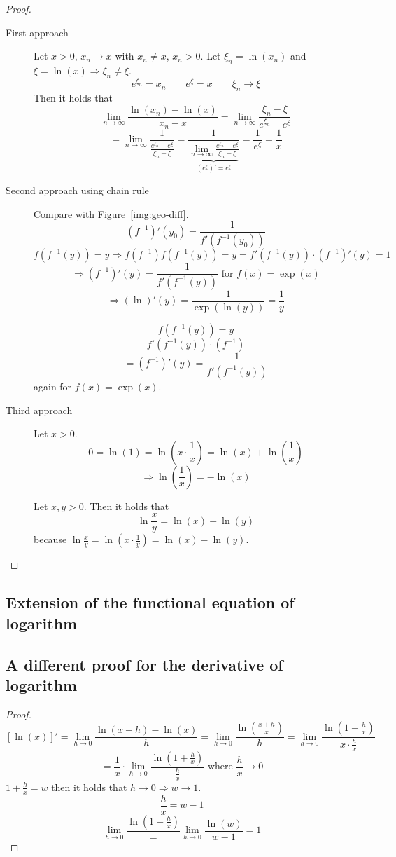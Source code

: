 \documentclass[a4paper,landscape,twocolumn]{article}
\theoremstyle{definition}
\begin{document}
\begin{proof}
  \begin{description}
    \item[First approach]
      Let $x > 0$, $x_n \to x$ with $x_n \neq x$, $x_n > 0$.
      Let $\xi_n = \ln(x_n)$ and $\xi = \ln(x) \Rightarrow \xi_n \neq \xi$.
      \[ e^{\xi_n} = x_n \qquad e^\xi = x \qquad \xi_n \to \xi \]
      Then it holds that
      \[ \lim_{n\to\infty} \frac{\ln(x_n) - \ln(x)}{x_n - x} = \lim_{n\to\infty} \frac{\xi_n - \xi}{e^{\xi_n} - e^\xi} \]
      \[
        = \lim_{n\to\infty} \frac{1}{\frac{e^{\xi_n} - e^\xi}{\xi_n - \xi}}
        = \frac{1}{\underbrace{\lim_{n\to\infty} \frac{e^{\xi_n} - e^\xi}{\xi_n - \xi}}_{(e^\xi)' = e^\xi}}
        = \frac1{e^\xi} = \frac1x
      \]
    \item[Second approach using chain rule]
      Compare with Figure~\ref{img:geo-diff}.
      \[ (f^{-1})'(y_0) = \frac{1}{f'(f^{-1}(y_0))} \]
      \[ f(f^{-1}(y)) = y \Rightarrow f(f^{-1}) f(f^{-1}(y)) = y = f'(f^{-1}(y)) \cdot (f^{-1})'(y) = 1 \]
      \[ \Rightarrow (f^{-1})'(y) = \frac{1}{f'(f^{-1}(y))} \text{ for } f(x) = \exp(x) \]
      \[ \Rightarrow (\ln)'(y) = \frac{1}{\exp(\ln(y))} = \frac{1}{y} \]

      \[ f(f^{-1}(y)) = y \]
      \[ f'(f^{-1}(y)) \cdot (f^{-1}) \]
      \[ = (f^{-1})'(y) = \frac{1}{f'(f^{-1}(y))} \]
      again for $f(x) = \exp(x)$.
    \item[Third approach]
      Let $x > 0$.
      \[ 0 = \ln(1) = \ln\left(x \cdot \frac1x\right) = \ln(x) + \ln\left(\frac1x\right) \]
      \[ \Rightarrow \ln\left(\frac1x\right) = -\ln(x) \]

      Let $x,y > 0$. Then it holds that
      \[ \ln{\frac{x}{y}} = \ln(x) - \ln(y) \]
      because $\ln\frac{x}{y} = \ln(x \cdot \frac1y) = \ln(x) - \ln(y)$.
  \end{description}
\end{proof}

\subsection{Extension of the functional equation of logarithm}
%


\subsection{A different proof for the derivative of logarithm}
%
\begin{proof}
  \[
    [\ln(x)]'
    = \lim_{h\to0} \frac{\ln(x + h) - \ln(x)}{h}
    = \lim_{h\to0} \frac{\ln\left(\frac{x+h}{x}\right)}{h}
    = \lim_{h\to0} \frac{\ln\left(1 + \frac{h}{x}\right)}{x \cdot \frac hx}
  \] \[
    = \frac1x \cdot \lim_{h\to0} \frac{\ln\left(1 + \frac{h}{x}\right)}{\frac{h}{x}}
    \text{ where } \frac hx \to 0
  \]
  $1 + \frac{h}{x} = w$ then it holds that $h \to 0 \Rightarrow w \to 1$.
  \[ \frac{h}{x} = w - 1 \]
  \[ \lim_{h\to0} \frac{\ln\left(1 + \frac{h}{x}\right)} = \lim_{h\to0} \frac{\ln(w)}{w - 1} = 1 \]
\end{proof}
\end{document}
